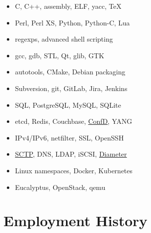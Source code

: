 \documentclass[a4paper,12pt]{article}
\newcommand{\compress}{\setlength\itemsep{-\parskip}}
\newenvironment{compressedItemize}{\begin{itemize}\compress}{\end{itemize}}
\begin{document}
\begin{multicols}{2}
\begin{compressedItemize}
\item	C, C++, assembly, ELF, yacc, \TeX
\item	Perl, Perl XS, Python, Python-C, Lua
\item	regexps, advanced shell scripting
\item	gcc, gdb, STL, Qt, glib, GTK
\item	autotools, CMake, Debian packaging
\item	Subversion, git, GitLab, Jira, Jenkins
\columnbreak
\item	SQL, PostgreSQL, MySQL, SQLite
\item	etcd, Redis, Couchbase,
	\href{http://www.tail-f.com/confd-basic}{ConfD}, YANG
\item	IPv4/IPv6, netfilter, SSL, OpenSSH
\item	\href{http://en.wikipedia.org/wiki/SCTP}{SCTP}, DNS, LDAP,
	iSCSI, \href{http://tools.ietf.org/html/rfc6733}{Diameter}
\item	Linux namespaces, Docker, Kubernetes
\item	Eucalyptus, OpenStack, qemu
\end{compressedItemize}
\end{multicols}

\section{Employment History}
\end{document}
